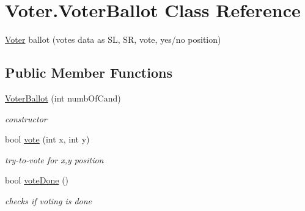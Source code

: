 \hypertarget{class_voter_1_1_voter_ballot}{}\section{Voter.\+Voter\+Ballot Class Reference}
\label{class_voter_1_1_voter_ballot}


\hyperlink{class_voter_1_1_voter}{Voter} ballot (vote\textquotesingle{}s data as S\+L, S\+R, vote, yes/no position)  


\subsection*{Public Member Functions}
\begin{DoxyCompactItemize}
\item 
\hyperlink{class_voter_1_1_voter_ballot_a78ca278f7add21b16e29b4f91569812e}{Voter\+Ballot} (int numb\+Of\+Cand)
\begin{DoxyCompactList}\small\item\em constructor \end{DoxyCompactList}\item 
bool \hyperlink{class_voter_1_1_voter_ballot_af73eb9545b6259715cea0a22f6a1c80f}{vote} (int x, int y)
\begin{DoxyCompactList}\small\item\em try-\/to-\/vote for x,y position \end{DoxyCompactList}\item 
bool \hyperlink{class_voter_1_1_voter_ballot_a00763bb4933a65ec908aedad2634ee05}{vote\+Done} ()
\begin{DoxyCompactList}\small\item\em checks if voting is done \end{DoxyCompactList}\end{DoxyCompactItemize}
